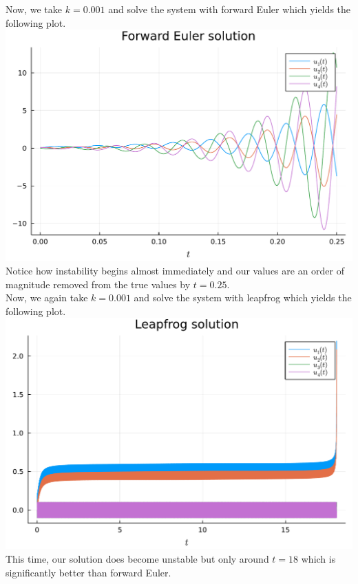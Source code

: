 \documentclass{article}
\begin{document}
Now, we take $k=0.001$ and solve the system with forward Euler which yields the following plot. \\
\includegraphics[scale=0.5]{fe.pdf}\\
Notice how instability begins almost immediately and our values are an order of magnitude removed from the true values by $t=0.25$. \\
Now, we again take $k=0.001$ and solve the system with leapfrog which yields the following plot. \\
\includegraphics[scale=0.5]{lf.pdf}\\
This time, our solution does become unstable but only around $t=18$ which is significantly better than forward Euler.\\
\end{document}
